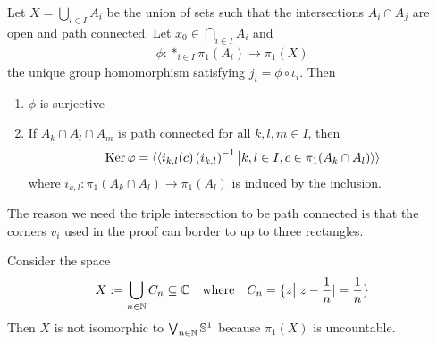 \begin{thm}
  Let $X = \bigcup_{i \in I}A_i$ be the union of sets such that the intersections $A_i \cap A_j$ are open and path connected.
  Let $x_0 \in \bigcap_{i \in I}A_i$ and 
  \begin{align*}
    \phi: \ast_{i \in I}\pi_1(A_i) \to  \pi_1(X)
  \end{align*}
  the unique group homomorphism satisfying $j_i = \phi \circ \iota_i$.
  Then
  \begin{enumerate}
    \item $\phi$ is surjective
    \item If $A_k \cap A_l \cap A_m$ is path connected for all $k,l,m \in I$, then
      \begin{align*}
        \operatorname{Ker} \varphi = \langle\langle
            i_{k,l}(c) \left(
              i_{k,l}
            \right)^{-1}
            \big\vert
            k,l \in I,
            c \in \pi_1(A_k \cap A_l)
        \rangle\rangle
      \end{align*}
      where $i_{k,l}: \pi_1(A_k \cap A_l) \to  \pi_1(A_l)$ is induced by the inclusion.
  \end{enumerate}
\end{thm}

The reason we need the triple intersection to be path connected is that the corners $v_i$ used in the proof can border to up to three rectangles.

\begin{ex}
Consider the space
\begin{align*}
  X := \bigcup_{n \in \mathbb{N}}C_n \subseteq \mathbb{C} \quad \text{where} \quad C_n = \{z \big\vert \vert z - \frac{1}{n}\vert = \frac{1}{n}\}
\end{align*}
Then $X$ is not isomorphic to $\bigvee_{n \in \mathbb{N}}\mathbb{S}^{1}$ because $\pi_1(X)$ is uncountable.
\end{ex}


%
